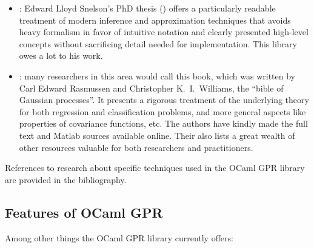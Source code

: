 \documentclass[10pt]{article}
\begin{document}
\begin{itemize}

\item
\emph{}: Edward
Lloyd Snelson's PhD thesis (\cite{SnelsonThesis}) offers a particularly
readable treatment of modern inference and approximation techniques
that avoids heavy formalism in favor of intuitive notation and
clearly presented high-level concepts without sacrificing detail
needed for implementation.  This library owes a lot to his work.

\item \emph{}: many researchers in this area
would call this book, which was written by Carl Edward Rasmussen
and Christopher K.\ I.\  Williams, the ``bible of Gaussian processes''.
It presents a rigorous treatment of the underlying theory for both
regression and classification problems, and more general aspects
like properties of covariance functions, etc.  The authors have
kindly made the full text and Matlab sources available online.
Their  also lists a great wealth of other resources valuable for
both researchers and practitioners.

\end{itemize}

References to research about specific techniques used in the OCaml
GPR library are provided in the bibliography.

\subsection{Features of OCaml GPR}

Among other things the OCaml GPR library currently offers:
\end{document}
